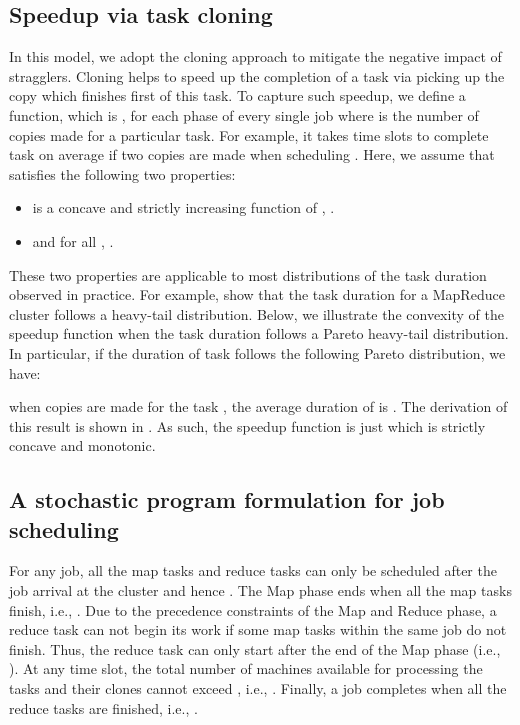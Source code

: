 \documentclass[10pt,conference,compsocconf,letterpaper]{IEEEtran}
\begin{document}
\subsection{Speedup via task cloning}
In this model, we adopt the cloning approach to mitigate the negative 
impact of stragglers. Cloning helps to speed up the completion of a task via picking up the copy which finishes first of this task.
To capture such speedup, we define a function, which is ,  for each phase of every single job where  is the number of copies made for a particular task. For example, it takes  time slots to complete task  on average if two copies are made when scheduling . Here, we assume that  satisfies the following two properties:
\begin{itemize}
\item  is a concave and strictly increasing function of , .
\item  and  for all , .
\end{itemize}
These two properties are applicable to most distributions of the task duration observed in practice. For example, 
\cite{Outliers,speculative-multiple-optimization} show that the task duration for a MapReduce cluster follows a heavy-tail distribution.  Below, we illustrate the convexity of 
the speedup function when the task duration follows a Pareto heavy-tail distribution.  In particular, if the duration  of task  follows the following Pareto distribution, we have:

when  copies are made for the task , the average duration of  is . The derivation of this result is shown in \cite{speculative-single-optimization}. As such, the speedup function is just  which is strictly concave and
monotonic.

\subsection{A stochastic program formulation for job scheduling}
For any job, all the map tasks and reduce tasks can only be scheduled after the job arrival at the cluster and hence . The Map phase ends when all the map tasks finish, i.e.,  . Due to the precedence constraints of the Map and Reduce phase, a reduce task can not begin its work if some map tasks within the same job do not finish. Thus, the reduce task  can only start after the end of the Map phase (i.e., ). At any time slot, the total number of machines available for processing the tasks and their clones cannot exceed , i.e., . Finally, a job completes when all the reduce tasks are finished, i.e.,  .
\end{document}

